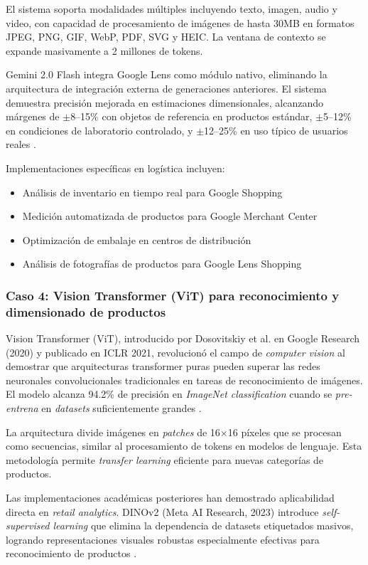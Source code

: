 El sistema soporta modalidades múltiples incluyendo texto, imagen, audio y video, con capacidad de procesamiento de imágenes de hasta 30MB en formatos JPEG, PNG, GIF, WebP, PDF, SVG y HEIC. La ventana de contexto se expande masivamente a 2 millones de tokens.

Gemini 2.0 Flash integra Google Lens como módulo nativo, eliminando la arquitectura de integración externa de generaciones anteriores. El sistema demuestra precisión mejorada en estimaciones dimensionales, alcanzando márgenes de $\pm$8--15\% con objetos de referencia en productos estándar, $\pm$5--12\% en condiciones de laboratorio controlado, y $\pm$12--25\% en uso típico de usuarios reales \cite{Team20252}.

Implementaciones específicas en logística incluyen:
\begin{itemize}
    \item Análisis de inventario en tiempo real para Google Shopping
    \item Medición automatizada de productos para Google Merchant Center
    \item Optimización de embalaje en centros de distribución
    \item Análisis de fotografías de productos para Google Lens Shopping
\end{itemize}

\subsubsection{Caso 4: Vision Transformer (ViT) para reconocimiento y dimensionado de productos}

Vision Transformer (ViT), introducido por Dosovitskiy et al. en Google Research (2020) y publicado en ICLR 2021, revolucionó el campo de \textit{computer vision} al demostrar que arquitecturas transformer puras pueden superar las redes neuronales convolucionales tradicionales en tareas de reconocimiento de imágenes. El modelo alcanza 94.2\% de precisión en \textit{ImageNet classification} cuando se \textit{pre-entrena} en \textit{datasets} suficientemente grandes \cite{Dosovitskiy2020}.

La arquitectura divide imágenes en \textit{patches} de 16$\times$16 píxeles que se procesan como secuencias, similar al procesamiento de tokens en modelos de lenguaje. Esta metodología permite \textit{transfer learning} eficiente para nuevas categorías de productos.

Las implementaciones académicas posteriores han demostrado aplicabilidad directa en \textit{retail analytics}. DINOv2 (Meta AI Research, 2023) introduce \textit{self-supervised learning} que elimina la dependencia de datasets etiquetados masivos, logrando representaciones visuales robustas especialmente efectivas para reconocimiento de productos \cite{Oquab2024}.

